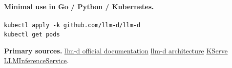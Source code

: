 \paragraph{Minimal use in Go / Python / Kubernetes.}
\begin{Verbatim}[fontsize=\scriptsize]
kubectl apply -k github.com/llm-d/llm-d
kubectl get pods
\end{Verbatim}
\textbf{Primary sources.} \href{https://llm-d.ai/docs/dev}{llm-d official documentation} \quad \href{https://llm-d.ai/docs/architecture}{llm-d architecture} \quad \href{https://kserve.github.io/website/docs/model-serving/generative-inference/llmisvc/llmisvc-overview}{KServe LLMInferenceService}.
